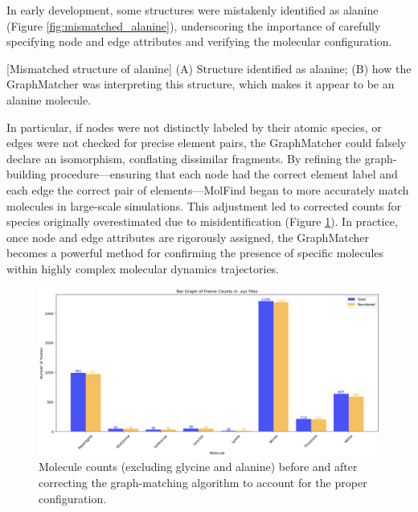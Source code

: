 In early development, some structures were mistakenly identified as alanine (Figure \ref{fig:mismatched_alanine}), underscoring the importance of carefully specifying node and edge attributes and verifying the molecular configuration.

\begin{flushleft}
\begin{multiFigure}
[Mismatched structure of alanine]{
(A) Structure identified as alanine; 
(B) how the GraphMatcher was interpreting this structure, which makes it appear to be an alanine molecule.}
\label{fig:mismatched_alanine}
\end{multiFigure}
\end{flushleft}

In particular, if nodes were not distinctly labeled by their atomic species, or edges were not checked for precise element pairs, the GraphMatcher could falsely declare an isomorphism, conflating dissimilar fragments. By refining the graph-building procedure—ensuring that each node had the correct element label and each edge the correct pair of elements—MolFind began to more accurately match molecules in large-scale simulations. This adjustment led to corrected counts for species originally overestimated due to misidentification (Figure \ref{fig:graph_matching}). In practice, once node and edge attributes are rigorously assigned, the GraphMatcher becomes a powerful method for confirming the presence of specific molecules within highly complex molecular dynamics trajectories.

\begin{figure}[!ht]
    \centering
    \includegraphics[width=1\linewidth]{Images/early_earth/remake_graph_matching.png}
    \caption[Molecules identified incorrectly in the initial search]{Molecule counts (excluding glycine and alanine) before and after correcting the graph-matching algorithm to account for the proper configuration.}
    \label{fig:graph_matching}
\end{figure}{}

